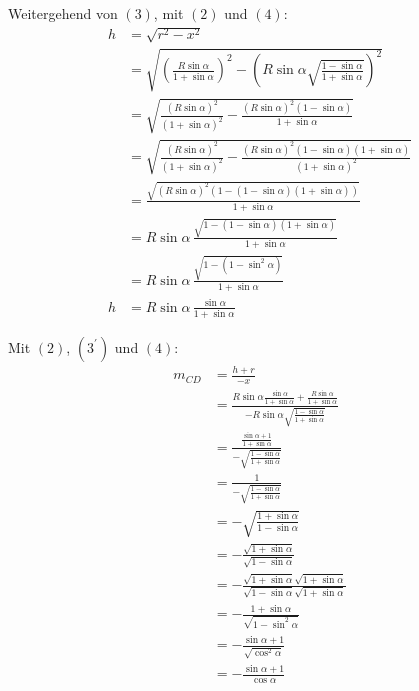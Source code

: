 \documentclass[12pt,a4paper,oneside]{article}
\begin{document}
\begin{samepage}
	Weitergehend von $(3)$, mit $(2)$ und $(4)$: \nopagebreak
	\begin{align*}
		h &= \sqrt{r^2-x^2} \\
		&= \sqrt{\left(\frac{R\sin\alpha}{1+\sin\alpha}\right)^2 - \left(R\sin\alpha\sqrt{\frac{1-\sin\alpha}{1+\sin\alpha}}\right)^2} \\
		&= \sqrt{\frac{(R\sin\alpha)^2}{(1+\sin\alpha)^2} - \frac{(R\sin\alpha)^2(1-\sin\alpha)}{1+\sin\alpha}} \\
		&= \sqrt{\frac{(R\sin\alpha)^2}{(1+\sin\alpha)^2} - \frac{(R\sin\alpha)^2(1-\sin\alpha)(1+\sin\alpha)}{(1+\sin\alpha)^2}} \\
		&= \frac{\sqrt{(R\sin\alpha)^2(1-(1-\sin\alpha)(1+\sin\alpha))}}{1+\sin\alpha} \\
		&= R\sin\alpha \, \frac{\sqrt{1-(1-\sin\alpha)(1+\sin\alpha)}}{1+\sin\alpha} \\
		&= R\sin\alpha \, \frac{\sqrt{1-(1-\sin^2\alpha)}}{1+\sin\alpha} \\
		h &= R\sin\alpha \, \frac{\sin\alpha}{1+\sin\alpha} \tag{$3^\prime$}
	\end{align*}
\end{samepage}
\begin{samepage}
	Mit $(2)$, $(3^\prime)$ und $(4)$: \nopagebreak
	\begin{align*}
		m_{CD} &= \frac{h+r}{-x} \\
		&= \frac{R\sin\alpha \frac{\sin\alpha}{1+\sin\alpha} + \frac{R\sin\alpha}{1+\sin\alpha}}{-R\sin\alpha\sqrt{\frac{1-\sin\alpha}{1+\sin\alpha}}} \\
		&= \frac{\frac{\sin\alpha+1}{1+\sin\alpha}}{-\sqrt{\frac{1-\sin\alpha}{1+\sin\alpha}}} \\
		&= \frac{1}{-\sqrt{\frac{1-\sin\alpha}{1+\sin\alpha}}} \\
		&= -\sqrt{\frac{1+\sin\alpha}{1-\sin\alpha}} \\
		&= -\frac{\sqrt{1+\sin\alpha}}{\sqrt{1-\sin\alpha}} \\
		&= -\frac{\sqrt{1+\sin\alpha}\sqrt{1+\sin\alpha}}{\sqrt{1-\sin\alpha}\sqrt{1+\sin\alpha}} \\
		&= -\frac{1+\sin\alpha}{\sqrt{1 - \sin^2\alpha}} \\
		&= -\frac{\sin\alpha+1}{\sqrt{\cos^2\alpha}} \\[15pt]
		&= -\frac{\sin\alpha+1}{\cos\alpha}
	\end{align*}
\end{samepage}
\goodbreak
\end{document}

